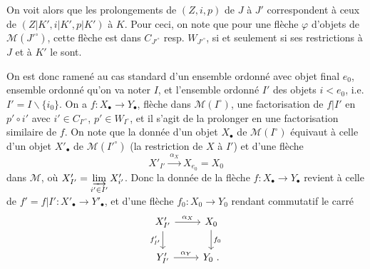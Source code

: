 \documentclass[11pt]{article}
\newcommand{\printedpage}[1]{\marginpar{\footnotesize p.~#1}}
\newcommand{\msp}[1]{\marginpar{\footnotesize [#1]}}
\begin{document}
On voit alors que les prolongements de $(Z,i,p)$ de $J$ à $J'$ correspondent à ceux de $(Z|K',i|K',p|K')$ à $K$. Pour ceci, on note que pour une flèche $\varphi$ d'objets de $\mathcal{M}(J'^\circ)$, cette flèche est dans $C_{J'^\circ}$ resp. $W_{J'^\circ}$, si et seulement si ses restrictions à $J$ et à $K'$ le sont.

On est donc ramené au cas standard d'un ensemble ordonné avec objet final $e_0$, ensemble ordonné qu'on va noter $I$, et l'ensemble ordonné $I'$ des objets $i<e_0$, i.e. $I'=I\backslash\{i_0\}$. %
On a $f:X_\bullet\longrightarrow Y_\bullet$, flèche dans $\mathcal{M}(I^\circ)$, une factorisation de $f|I'$ en $p'\circ i'$ avec $i'\in C_{I'^\circ}$, $p'\in W_{I^\circ}$, %
\msp{47}
et il s'agit de la prolonger en une factorisation similaire de $f$. On note que la donnée d'un objet $X_\bullet$ de $\mathcal{M}(I^\circ)$ équivaut à celle d'un objet $X'_\bullet$ de $\mathcal{M}(I'^\circ)$ (la restriction de $X$ à $I'$) et d'une flèche
\[
X'_{I'} \xrightarrow{\ \alpha_X\ } X_{e_0}=X_0
\]
dans $\mathcal{M}$, où $X'_{I'}=\varinjlim\limits_{i'\in I'}X'_{i'}$. Donc la donnée de la flèche $f:X_\bullet\longrightarrow Y_\bullet$ revient à celle de $f'=f|I':X'_\bullet\longrightarrow Y'_\bullet$, et d'une flèche $f_0:X_0\longrightarrow Y_0$ rendant commutatif le carré
\printedpage{25}
\[
\begin{tikzcd}
X'_{I'} \arrow[r, "\alpha_X"] \arrow[d, "f'_{I'}"'] & X_0 \arrow[d, "f_0"] \\
Y'_{I'} \arrow[r, "\alpha_Y"] & Y_0\ .
\end{tikzcd}
\]
\end{document}
